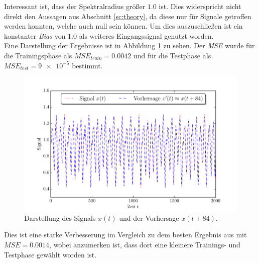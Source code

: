 Interessant ist, dass der Spektralradius größer $1.0$ ist. Dies widerspricht nicht direkt den Aussagen aus Abschnitt \ref{sc:theory}, da diese nur für Signale getroffen werden konnten, welche auch null sein können. Um dies auszuschließen ist ein konstanter \textit{Bias} von $1.0$ als weiteres Eingangssignal genutzt worden.\\
Eine Darstellung der Ergebnisse ist in Abbildung \ref{fig:application_mackeyglass} zu sehen. Der \textit{MSE} wurde für die Trainingsphase als $MSE_{train} = 0.0042$ und für die Testphase als $MSE_{test} = \num{9e-5}$ bestimmt.

\begin{figure}[H]
    \centering
    \includegraphics[width = 0.9 \textwidth]{figures/mackeyglass_pred.pdf}
    \caption{Darstellung des Signals $x(t)$ und der Vorhersage $x(t+84)$.}
    \label{fig:application_mackeyglass}
\end{figure}

Dies ist eine starke Verbesserung im Vergleich zu dem besten Ergebnis aus \citep{caraballo2014} mit $MSE = 0.0014$, wobei anzumerken ist, dass dort eine kleinere Trainings- und Testphase gewählt worden ist.
